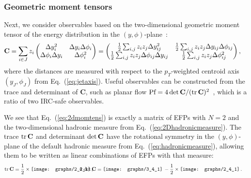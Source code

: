 \documentclass[letterpaper,11pt]{article}
\DeclareMathOperator{\tr}{tr}
\DeclareRobustCommand{\Eq}[1]{Eq.~(\ref{#1})}
\begin{document}
\subsubsection{Geometric moment tensors}
\label{sec:geometricmomenttensors}

Next, we consider observables based on the two-dimensional geometric moment tensor of the energy distribution in the $(y,\phi)$-plane~\cite{GurAri:2011vx,Gallicchio:2012ez}: 
\begin{align}
{\bf C}& = \sum_{i\in J} z_{i} \begin{pmatrix} \Delta y_i^2 & \Delta y_i\Delta\phi_i \\ \Delta\phi_i\Delta y_i & \Delta\phi_i^2 \end{pmatrix}= \begin{pmatrix}\frac12\sum_{i,j} z_{i}z_{j} \Delta y_{ij}^2 &\frac12\sum_{i,j} z_{i}z_{j} \Delta y_{ij}\Delta\phi_{ij} \\ \frac12\sum_{i,j} z_{i}z_{j} \Delta\phi_{ij}\Delta y_{ij} &\frac12\sum_{i,j} z_{i}z_{j} \Delta\phi_{ij}^2\end{pmatrix},
\label{eq:2dmomtens}
\end{align}
where the distances are measured with respect to the $p_T$-weighted centroid axis $(y_J,\phi_J)$ from \Eq{eq:jetaxis}.
%
Useful observables can be constructed from the trace and determinant of {\bf C}, such as planar flow $\text{Pf} = 4 \det{\bf C}/(\tr {\bf C})^2$~\cite{Thaler:2008ju,Almeida:2008yp}, which is a ratio of two IRC-safe observables.

We see that \Eq{eq:2dmomtens} is exactly a matrix of EFPs with $N=2$ and the two-dimensional hadronic measure from \Eq{eq:2Dhadronicmeasure}.
%
The trace $\tr {\bf C}$ and determinant $\det{\bf C}$ have the rotational symmetry in the $(y,\phi)$-plane of the default hadronic measure from \Eq{eq:hadronicmeasure}, allowing them to be written as linear combinations of EFPs with that measure:
\begin{align}\label{eq:momentpoly}
\tr \bf C&=\frac12\times
\begin{gathered}
\texttt{[image: graphs/2\_2\_1]}
\end{gathered}\,,&\hspace{-.5in}
4\,\det{\bf C}&= 
\begin{gathered}
\texttt{[image: graphs/3\_4\_1]}
\end{gathered}\,
-\frac12\times
\begin{gathered}
\texttt{[image: graphs/2\_4\_1]}
\end{gathered}\,.
\end{align}
\end{document}
